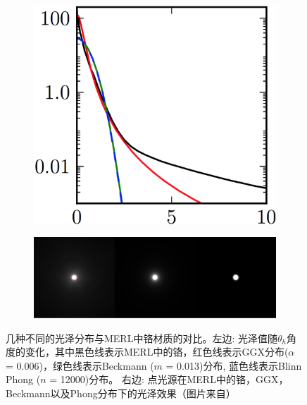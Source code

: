 \begin{figure}
\begin{fullwidth}
	\begin{subfigure}[b]{0.27\thewidth}
		\includegraphics[width=1.\textwidth]{graphics/gi/ray-optics-13-1}
	\end{subfigure}
	\begin{subfigure}[b]{0.72\thewidth}
		\includegraphics[width=1.\textwidth]{graphics/gi/ray-optics-13-2}
	\end{subfigure}
\caption{几种不同的光泽分布与MERL中铬材质的对比。左边: 光泽值随$\theta_h$角度的变化，其中黑色线表示MERL中的铬，红色线表示GGX分布($\alpha$ = 0.006)，绿色线表示Beckmann ($m$ = 0.013)分布, 蓝色线表示Blinn Phong ($n$ = 12000)分布。 右边: 点光源在MERL中的铬，GGX，Beckmann以及Phong分布下的光泽效果（图片来自\cite{a:PhysicallyBasedShadingatDisney}）}
\label{f:intro-specular-lob-tails}
\end{fullwidth}
\end{figure}

